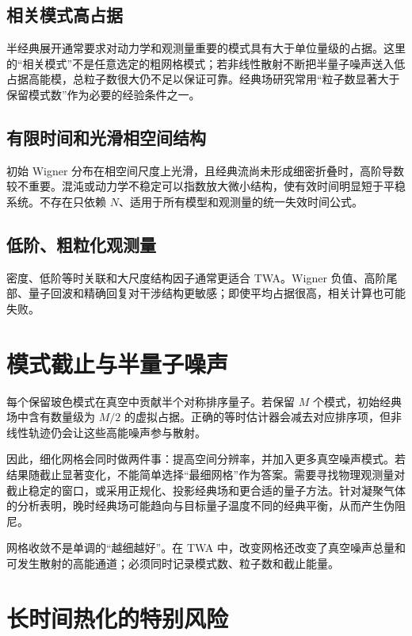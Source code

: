 \subsection{相关模式高占据}

半经典展开通常要求对动力学和观测量重要的模式具有大于单位量级的占据。这里的“相关模式”不是任意选定的粗网格模式；若非线性散射不断把半量子噪声送入低占据高能模，总粒子数很大仍不足以保证可靠。经典场研究常用“粒子数显著大于保留模式数”作为必要的经验条件之一\cite{Sinatra2002,Blakie2008}。

\subsection{有限时间和光滑相空间结构}

初始 Wigner 分布在相空间尺度上光滑，且经典流尚未形成细密折叠时，高阶导数较不重要。混沌或动力学不稳定可以指数放大微小结构，使有效时间明显短于平稳系统。不存在只依赖 $N$、适用于所有模型和观测量的统一失效时间公式。

\subsection{低阶、粗粒化观测量}

密度、低阶等时关联和大尺度结构因子通常更适合 TWA。Wigner 负值、高阶尾部、量子回波和精确回复对干涉结构更敏感；即使平均占据很高，相关计算也可能失败。

\section{模式截止与半量子噪声}

每个保留玻色模式在真空中贡献半个对称排序量子。若保留 $M$ 个模式，初始经典场中含有数量级为 $M/2$ 的虚拟占据。正确的等时估计器会减去对应排序项，但非线性轨迹仍会让这些高能噪声参与散射。

因此，细化网格会同时做两件事：提高空间分辨率，并加入更多真空噪声模式。若结果随截止显著变化，不能简单选择“最细网格”作为答案。需要寻找物理观测量对截止稳定的窗口，或采用正规化、投影经典场和更合适的量子方法。针对凝聚气体的分析表明，晚时经典场可能趋向与目标量子温度不同的经典平衡，从而产生伪阻尼\cite{Sinatra2002}。

\begin{warningbox}
网格收敛不是单调的“越细越好”。在 TWA 中，改变网格还改变了真空噪声总量和可发生散射的高能通道；必须同时记录模式数、粒子数和截止能量。
\end{warningbox}

\section{长时间热化的特别风险}

